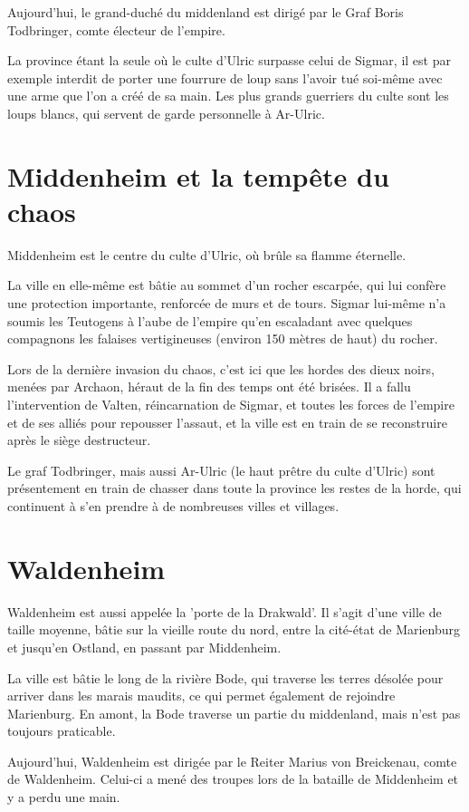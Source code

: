 \documentclass[10pt,a4paper]{book}
\begin{document}
Aujourd'hui, le grand-duché du middenland est dirigé par le Graf Boris Todbringer, comte électeur de l'empire.

La province étant la seule où le culte d'Ulric surpasse celui de Sigmar, il est par exemple interdit de porter une fourrure de loup sans l'avoir tué soi-même avec une arme que l'on a créé de sa main. Les plus grands guerriers du culte sont les loups blancs, qui servent de garde personnelle à Ar-Ulric.
\section{Middenheim et la tempête du chaos}
Middenheim est le centre du culte d'Ulric, où brûle sa flamme éternelle.

La ville en elle-même est bâtie au sommet d'un rocher escarpée, qui lui confère une protection importante, renforcée de murs et de tours. Sigmar lui-même n'a soumis les Teutogens à l'aube de l'empire qu'en escaladant avec quelques compagnons les falaises vertigineuses (environ 150 mètres de haut) du rocher.

Lors de la dernière invasion du chaos, c'est ici que les hordes des dieux noirs, menées par Archaon, héraut de la fin des temps ont été brisées. Il a fallu l'intervention de Valten, réincarnation de Sigmar, et toutes les forces de l'empire et de ses alliés pour repousser l'assaut, et la ville est en train de se reconstruire après le siège destructeur.

Le graf Todbringer, mais aussi Ar-Ulric (le haut prêtre du culte d'Ulric) sont présentement en train de chasser dans toute la province les restes de la horde, qui continuent à s'en prendre à de nombreuses villes et villages.
\section{Waldenheim}
Waldenheim est aussi appelée la 'porte de la Drakwald'. Il s'agit d'une ville de taille moyenne, bâtie sur la vieille route du nord, entre la cité-état de Marienburg et jusqu'en Ostland, en passant par Middenheim.

La ville est bâtie le long de la rivière Bode, qui traverse les terres désolée pour arriver dans les marais maudits, ce qui permet également de rejoindre Marienburg. En amont, la Bode traverse un partie du middenland, mais n'est pas toujours praticable.

Aujourd'hui, Waldenheim est dirigée par le Reiter Marius von Breickenau, comte de Waldenheim. Celui-ci a mené des troupes lors de la bataille de Middenheim et y a perdu une main.
\end{document}
